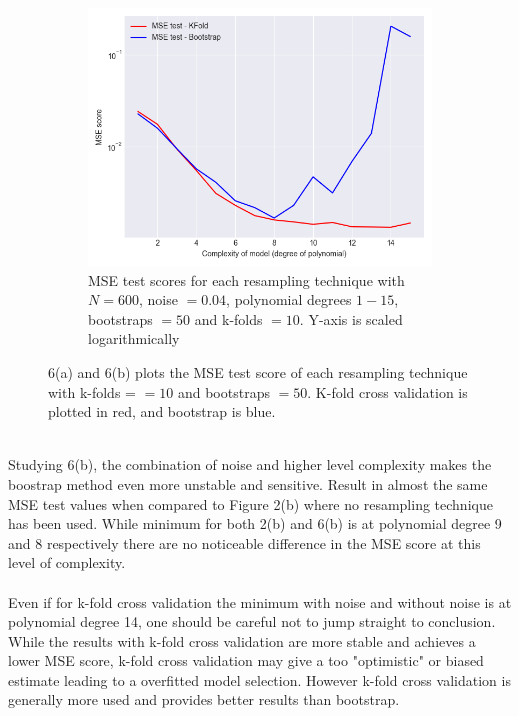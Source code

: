 \documentclass[a4paper,twocolumn]{article}
\begin{document}
\begin{figure}[ht]
    \begin{subfigure}[b]{0.9\columnwidth}
        \includegraphics[width=\columnwidth]{kfold_vs_bootstrap_Bootstraps=50,KFolds=10_N=600_Noise=0.04_Degree=1-15.png}
        \caption{MSE test scores for each resampling technique with $N = 600$, noise $= 0.04$, polynomial degrees $1- 15$, bootstraps $= 50$ and k-folds $= 10$. Y-axis is scaled logarithmically}
    \end{subfigure}
    \caption{6(a) and 6(b) plots the MSE test score of each resampling technique with k-folds = $=10$ and bootstraps $= 50$. K-fold cross validation is plotted in red, and bootstrap is blue.}
\end{figure}\\
Studying 6(b), the combination of noise and higher level complexity makes the boostrap method even more unstable and sensitive. Result in almost the same MSE test values when compared to Figure 2(b) where no resampling technique has been used. While minimum for both 2(b) and 6(b) is at polynomial degree 9 and 8 respectively there are no noticeable difference in the MSE score at this level of complexity. \\
\\
Even if for k-fold cross validation the minimum with noise and without noise is at polynomial degree 14, one should be careful not to jump straight to conclusion. While the results with k-fold cross validation are more stable and achieves a lower MSE score, k-fold cross validation may give a too "optimistic" or biased estimate leading to a overfitted model selection\cite{kfold1, kfold2}. However k-fold cross validation is generally more used and provides better results than bootstrap.\\
\end{document}
